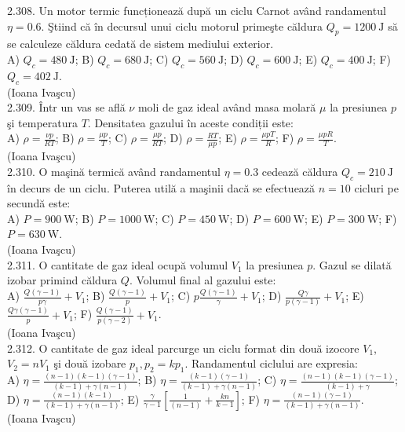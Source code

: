 2.308. Un motor termic funcționează după un ciclu Carnot având randamentul $\eta=0.6$. Ştiind că în decursul unui ciclu motorul primeşte căldura $Q_{p}=1200 \mathrm{~J}$ să se calculeze căldura cedată de sistem mediului exterior.\\ A) $Q_{c}=480 \mathrm{~J}$; B) $Q_{c}=680 \mathrm{~J}$; C) $Q_{c}=560 \mathrm{~J}$; D) $Q_{c}=600 \mathrm{~J}$; E) $Q_{c}=400 \mathrm{~J}$; F) $Q_{c}=402 \mathrm{~J}$.\\ (Ioana Ivaşcu)\\

2.309. Într un vas se află $\nu$ moli de gaz ideal având masa molară $\mu$ la presiunea $p$ şi temperatura $T$. Densitatea gazului în aceste condiții este:\\ A) $\rho=\frac{\nu p}{R T}$; B) $\rho=\frac{\mu p}{T}$; C) $\rho=\frac{\mu p}{R T}$; D) $\rho=\frac{R T}{\mu p}$; E) $\rho=\frac{\mu p T}{R}$; F) $\rho=\frac{\mu p R}{T}$.\\ (Ioana Ivaşcu)\\

2.310. O maşină termică având randamentul $\eta=0.3$ cedează căldura $Q_{c}=210 \mathrm{~J}$ în decurs de un ciclu. Puterea utilă a maşinii dacă se efectuează $n=10$ cicluri pe secundă este:\\ A) $P=900 \mathrm{~W}$; B) $P=1000 \mathrm{~W}$; C) $P=450 \mathrm{~W}$; D) $P=600 \mathrm{~W}$; E) $P=300 \mathrm{~W}$; F) $P=630 \mathrm{~W}$.\\ (Ioana Ivaşcu)\\

2.311. O cantitate de gaz ideal ocupă volumul $V_{1}$ la presiunea $p$. Gazul se dilată izobar primind căldura $Q$. Volumul final al gazului este:\\ A) $\frac{Q(\gamma-1)}{p \gamma}+V_{1}$; B) $\frac{Q(\gamma-1)}{p}+V_{1}$; C) $p \frac{Q(\gamma-1)}{\gamma}+V_{1}$; D) $\frac{Q \gamma}{p(\gamma-1)}+V_{1}$; E) $\frac{Q \gamma(\gamma-1)}{p}+V_{1}$; F) $\frac{Q(\gamma-1)}{p(\gamma-2)}+V_{1}$.\\ (Ioana Ivaşcu)\\

2.312. O cantitate de gaz ideal parcurge un ciclu format din două izocore $V_{1}$, $V_{2}=n V_{1}$ şi două izobare $p_{1}, p_{2}=k p_{1}$. Randamentul ciclului are expresia:\\ A) $\eta=\frac{(n-1)(k-1)(\gamma-1)}{(k-1)+\gamma(n-1)}$; B) $\eta=\frac{(k-1)(\gamma-1)}{(k-1)+\gamma(n-1)}$; C) $\eta=\frac{(n-1)(k-1)(\gamma-1)}{(k-1)+\gamma}$; D) $\eta=\frac{(n-1)(k-1)}{(k-1)+\gamma(n-1)}$; E) $\frac{\gamma}{\gamma-1}\left[\frac{1}{(n-1)}+\frac{k n}{k-1}\right]$; F) $\eta=\frac{(n-1)(\gamma-1)}{(k-1)+\gamma(n-1)}$.\\ (Ioana Ivaşcu)\\

